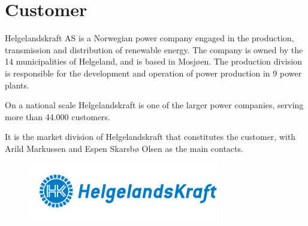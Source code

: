\section{Customer}
Helgelandskraft AS is a Norwegian power company engaged in the production,
transmission and distribution of renewable energy. The company is owned by
the 14 municipalities of Helgeland, and is based in Mosjøen. The production
division is responsible for the development and operation of power production
in 9 power plants.

On a national scale Helgelandskraft is one of the larger power companies,
serving more than 44.000 customers.

It is the market division of Helgelandskraft that constitutes the customer,
with Arild Markussen and Espen Skarsbø Olsen as the main contacts. \cite{helgelandskraft}

\begin{figure}[H]
	\includegraphics[scale=1.0]{pictures/helgelandskraft.png}
\end{figure}
